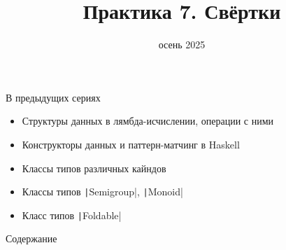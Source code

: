 
\newif\ifhandout




\title[7. Свёртки]{Практика 7. Свёртки}
\date{осень 2025}



    \mymaketitle

    \begin{frame}[fragile]{В предыдущих сериях}
        \begin{itemize}
            \item Структуры данных в лямбда-исчислении, операции с ними
            \item Конструкторы данных и паттерн-матчинг в Haskell
            \item Классы типов различных кайндов
            \item[\newtopic] Классы типов \texttt|Semigroup|, \texttt|Monoid|
            \item[\newtopic] Класс типов \texttt|Foldable|
        \end{itemize}
    \end{frame}

    \begin{frame}[noframenumbering]{Содержание}
        \tableofcontents
    \end{frame}


